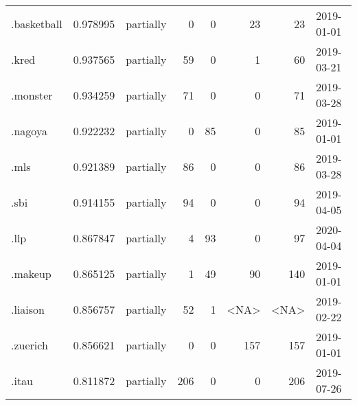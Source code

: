 \begin{tabular}{lrlrrrrl}
.basketball               &          0.978995 &       partially &                           0 &                           0 &                          23 &                  23 &           2019-01-01 \\
.kred                     &          0.937565 &       partially &                          59 &                           0 &                           1 &                  60 &           2019-03-21 \\
.monster                  &          0.934259 &       partially &                          71 &                           0 &                           0 &                  71 &           2019-03-28 \\
.nagoya                   &          0.922232 &       partially &                           0 &                          85 &                           0 &                  85 &           2019-01-01 \\
.mls                      &          0.921389 &       partially &                          86 &                           0 &                           0 &                  86 &           2019-03-28 \\
.sbi                      &          0.914155 &       partially &                          94 &                           0 &                           0 &                  94 &           2019-04-05 \\
.llp                      &          0.867847 &       partially &                           4 &                          93 &                           0 &                  97 &           2020-04-04 \\
.makeup                   &          0.865125 &       partially &                           1 &                          49 &                          90 &                 140 &           2019-01-01 \\
.liaison                  &          0.856757 &       partially &                          52 &                           1 &                        <NA> &                <NA> &           2019-02-22 \\
.zuerich                  &          0.856621 &       partially &                           0 &                           0 &                         157 &                 157 &           2019-01-01 \\
.itau                     &          0.811872 &       partially &                         206 &                           0 &                           0 &                 206 &           2019-07-26 \\

\end{tabular}
